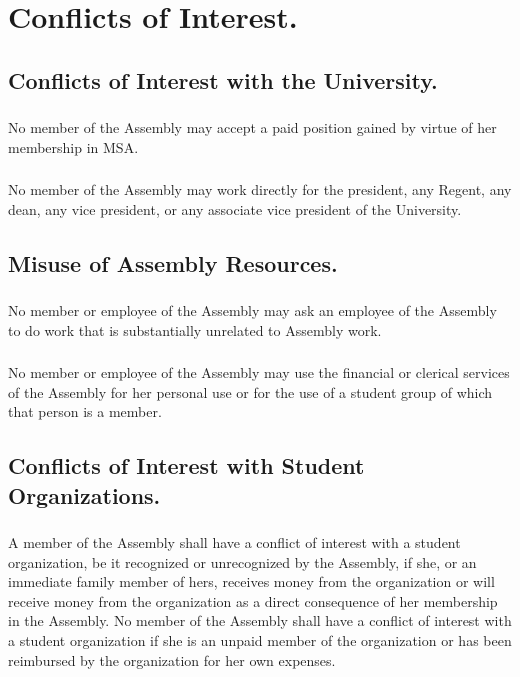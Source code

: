 \article{}

\section{Conflicts of Interest.}

\subsection{Conflicts of Interest with the University.}  
\subsubsection{}
No member of the Assembly may accept a paid position gained by virtue of her membership in MSA. 
\subsubsection{}
No member of the Assembly may work directly for the president, any Regent, any dean, any vice president, or any associate vice president of the University. 

\subsection{Misuse of Assembly Resources.}
\subsubsection{}
No member or employee of the Assembly may ask an employee of the Assembly to do work that is substantially unrelated to Assembly work.
\subsubsection{}
No member or employee of the Assembly may use the financial or clerical services of the Assembly for her personal use or for the use of a student group of which that person is a member.  


\subsection{Conflicts of Interest with Student Organizations.}
\subsubsection{}
A member of the Assembly shall have a conflict of interest with a student organization, be it recognized or unrecognized by the Assembly, if she, or an immediate family member of hers, receives money from the organization or will receive money from the organization as a direct consequence of her membership in the Assembly.  No member of the Assembly shall have a conflict of interest with a student organization if she is an unpaid member of the organization or has been reimbursed by the organization for her own expenses.
